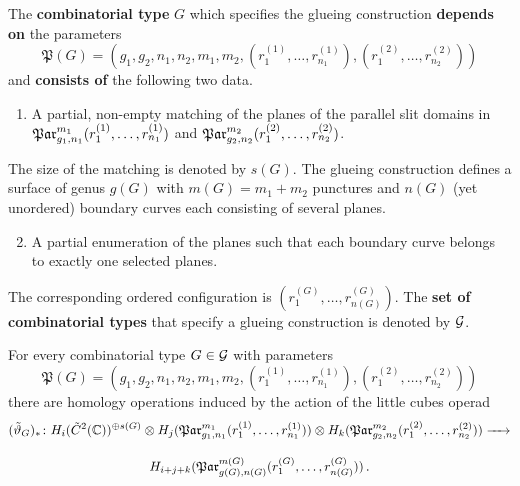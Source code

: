 \begin{defi*}[B., H.]
    The {\bfseries combinatorial type} $G$ which specifies the glueing construction {\bfseries depends on} the parameters
    \[
        \mathfrak P(G) = (g_1, g_2, n_1, n_2, m_1, m_2, (r_1^{(1)}, \ldots, r_{n_1}^{(1)}), (r_1^{(2)}, \ldots, r_{n_2}^{(2)}))
    \]
    and {\bfseries consists of} the following two data.
    \begin{enumerate}
        \item A partial, non-empty matching of the planes of the parallel slit domains in $\Par_{g_1, n_1}^{m_1}(r_1^{(1)}, \ldots, r_{n_1}^{(1)})$ and $\Par_{g_2, n_2}^{m_2}(r_1^{(2)}, \ldots, r_{n_2}^{(2)})$.
    \end{enumerate}
    The size of the matching is denoted by $s(G)$.
    The glueing construction defines a surface of genus $g(G)$ with $m(G) = m_1 + m_2$ punctures and $n(G)$ (yet unordered) boundary curves each consisting of several planes.
    \begin{enumerate}
        \setcounter{enumi}{1}
        \item A partial enumeration of the planes such that each boundary curve belongs to exactly one selected planes.
    \end{enumerate}
    The corresponding ordered configuration is $(r^{(G)}_1, \ldots, r^{(G)}_{n(G)})$.
    The {\bfseries set of combinatorial types} that specify a glueing construction is denoted by $\mathcal{G}$.
\end{defi*}
\begin{prop*}[Bödigheimer]
    For every combinatorial type $G \in \mathcal{G}$ with parameters
    \[
        \mathfrak P(G) = (g_1, g_2, n_1, n_2, m_1, m_2, (r_1^{(1)}, \ldots, r_{n_1}^{(1)}), (r_1^{(2)}, \ldots, r_{n_2}^{(2)}))
    \]
    there are homology operations induced by the action of the little cubes operad
    \begin{multline*}
        (\tilde\vartheta_G)_\ast \colon 
            H_i(\cspc 2(\C))^{\oplus s(G)} \otimes
            H_j(\Par_{g_1, n_1}^{m_1}(r_1^{(1)}, \ldots, r_{n_1}^{(1)})) \otimes
            H_k(\Par_{g_2, n_2}^{m_2}(r_1^{(2)}, \ldots, r_{n_2}^{(2)})) \to\\[10pt]
            H_{i+j+k}(\Par_{g(G), n(G)}^{m(G)}(r^{(G)}_1, \ldots, r^{(G)}_{n(G)}))\,.
    \end{multline*}
\end{prop*}

